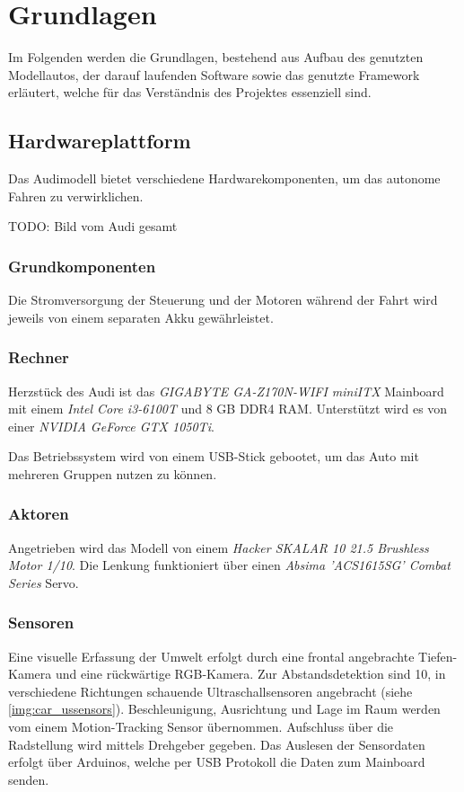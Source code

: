 \documentclass[12pt, a4paper]{scrartcl}
\begin{document}
\newpage
\section{Grundlagen}
Im Folgenden werden die Grundlagen, bestehend aus Aufbau des genutzten Modellautos, der darauf laufenden Software sowie das genutzte Framework erläutert, welche für das Verständnis des Projektes essenziell sind.

\subsection{Hardwareplattform}
Das Audimodell bietet verschiedene Hardwarekomponenten, um das autonome Fahren zu verwirklichen.

TODO: Bild vom Audi gesamt

\subsubsection{Grundkomponenten}
Die Stromversorgung der Steuerung und der Motoren während der Fahrt wird jeweils von einem separaten Akku gewährleistet.

\subsubsection{Rechner}
Herzstück des Audi ist das \emph{GIGABYTE GA-Z170N-WIFI miniITX} Mainboard mit einem \emph{Intel Core i3-6100T} und 8 GB DDR4 RAM. Unterstützt wird es von einer \emph{NVIDIA GeForce GTX 1050Ti}.

Das Betriebssystem wird von einem USB-Stick gebootet, um das Auto mit mehreren Gruppen nutzen zu können.

\subsubsection{Aktoren}
Angetrieben wird das Modell von einem \emph{Hacker SKALAR 10 21.5 Brushless Motor 1/10}.
Die Lenkung funktioniert über einen \emph{Absima 'ACS1615SG' Combat Series} Servo. 

\subsubsection{Sensoren}
Eine visuelle Erfassung der Umwelt erfolgt durch eine frontal angebrachte Tiefen-Kamera und eine rückwärtige RGB-Kamera. Zur Abstandsdetektion sind 10, in verschiedene Richtungen schauende Ultraschallsensoren angebracht (siehe \autoref{img:car_ussensors}). Beschleunigung, Ausrichtung und Lage im Raum werden vom einem Motion-Tracking Sensor übernommen. Aufschluss über die Radstellung wird mittels Drehgeber gegeben. Das Auslesen der Sensordaten erfolgt über Arduinos, welche per USB Protokoll die Daten zum Mainboard senden.
\end{document}
